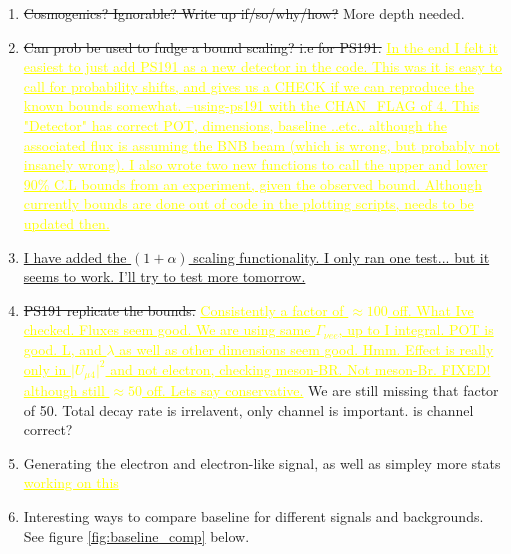 \documentclass[11pt, a4paper]{article}
\newcommand{\newtext}[2]{\textcolor{#1}{\ul{#2}}}
\begin{document}
\begin{enumerate}
\item \sout{Cosmogenics? Ignorable? Write up if/so/why/how?} More depth needed.

\item \sout{Can prob be used to fudge a bound scaling? i.e for PS191.}
\newtext{MARK}{In the end I felt it easiest to just add PS191 as a new detector
in the code. This was it is easy to call for probability shifts, and gives us a
CHECK if we can reproduce the known bounds somewhat.  --using-ps191 with the
CHAN\_FLAG of 4.  This "Detector" has correct POT, dimensions, baseline ..etc..
although the associated flux is assuming the BNB beam (which is wrong, but
probably not insanely wrong). I also wrote two new functions to call the upper
and lower 90\% C.L bounds from an experiment, given the observed bound.
Although currently bounds are done out of code in the plotting scripts, needs
to be updated then. }

\item \newtext{PB}{I have added the $(1+\alpha)$ scaling functionality. I only
ran one test... but it seems to work. I'll try to test more tomorrow.} 

\item \sout{PS191 replicate the bounds.} \newtext{MARK}{Consistently a factor of $\approx 100$ off. What Ive checked. Fluxes seem good. We are using same $\Gamma_{\nu ee}$, up to I integral. POT is good. L, and $\lambda$ as well as other dimensions seem good. Hmm. Effect is really only in $\vert U_{\mu 4}\vert^2$ and not electron, checking meson-BR. Not meson-Br. FIXED! although still $\approx 50$ off. Lets say conservative.} 
	We are still missing that factor of 50. Total decay rate is irrelavent, only channel is important. is channel correct?

\item Generating the electron and electron-like signal, as well as simpley more stats \newtext{MARK}{working on this}

\item Interesting ways to compare baseline for different signals and backgrounds. See figure \ref{fig:baseline_comp} below.






\end{enumerate}
\end{document}
